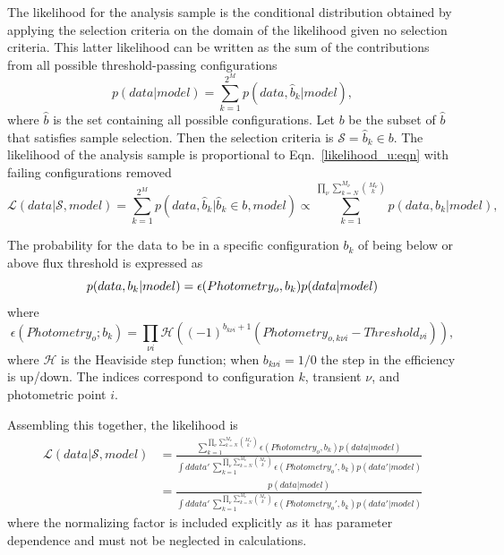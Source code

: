 \documentclass[preprint,3p]{elsarticle}
\begin{document}
The likelihood for the analysis
sample is the conditional distribution obtained by applying the selection criteria
on the domain of the likelihood given no selection criteria.  This latter likelihood
can be written
as the sum of the contributions from all possible threshold-passing configurations
\begin{equation}
p(data|model) = \sum_{k=1}^{2^M} p(data, \hat{b}_k| model),
\label{likelihood_u:eqn}
\end{equation}
where $\hat{b}$ is the set containing all possible configurations.
Let $b$ be the subset of $\hat{b}$ 
that satisfies sample selection. Then the selection criteria is $\mathcal{S} = \hat{b}_k
\in b$.
The likelihood of the analysis sample is proportional to Eqn.~\ref{likelihood_u:eqn}
with failing configurations removed
\begin{equation}
\mathcal{L}(data|\mathcal{S}, model) =
\sum_{k=1}^{2^M} p(data, \hat{b}_k| \hat{b}_k
\in b, model) \propto \sum_{k=1}^{\prod_\nu \sum_{k=N}^{M_{\nu}} \binom{M_{\nu}}{k}} p(data, b_k| model),
\end{equation}


The probability for the data to be in a specific configuration $b_k$ of
being below or above flux threshold is expressed
as
\begin{equation}
p(data, b_k| model)  = \epsilon(Photometry_o, b_k)p(data| model)\\
\end{equation}
where
\begin{equation}
\epsilon(Photometry_o; b_{k})= \prod_{\nu i}\mathcal{H}\left((-1)^{b_{k\nu i}+1}(Photometry_{o,k\nu i}-Threshold_{\nu i})\right),
\label{eff:eqn}
\end{equation}
where $\mathcal{H}$ is the Heaviside step function; when $b_{k\nu i}=1/0$ the step in the efficiency
is up/down.  The indices correspond to configuration $k$,
transient $\nu$, and photometric point $i$.

Assembling this together, the likelihood is
\begin{align}
\mathcal{L}(data|\mathcal{S}, model) & = \frac{\sum_{k=1}^{\prod_\nu \sum_{k=N}^{M_{\nu}} \binom{M_{\nu}}{k}} \epsilon(Photometry_o, b_k)p(data| model)}{\int ddata'\,
\sum_{k=1}^{\prod_\nu \sum_{k=N}^{M_{\nu}} \binom{M_{\nu}}{k}} \epsilon(Photometry_o', b_k)p(data'| model)
}\\
& = \frac{p(data| model)}{\int ddata'\,
\sum_{k=1}^{\prod_\nu \sum_{k=N}^{M_{\nu}} \binom{M_{\nu}}{k}} \epsilon(Photometry_o', b_k)p(data'| model)
}
\end{align}
where the normalizing factor is included explicitly as it has 
parameter dependence and must not be neglected in calculations.
\end{document}
